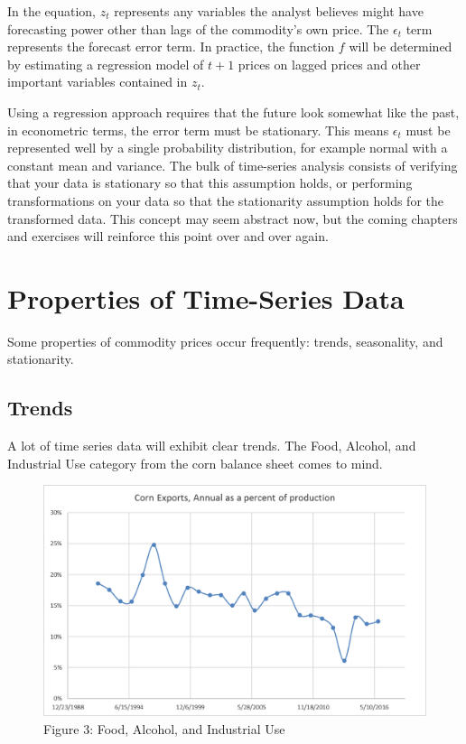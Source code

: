 \documentclass[]{book}
\theoremstyle{definition}
\theoremstyle{definition}
\theoremstyle{remark}
\begin{document}
In the equation, \(z_t\) represents any variables the analyst believes
might have forecasting power other than lags of the commodity's own
price. The \(\epsilon_t\) term represents the forecast error term. In
practice, the function \(f\) will be determined by estimating a
regression model of \(t+1\) prices on lagged prices and other important
variables contained in \(z_t\).

Using a regression approach requires that the future look somewhat like
the past, in econometric terms, the error term must be stationary. This
means \(\epsilon_t\) must be represented well by a single probability
distribution, for example normal with a constant mean and variance. The
bulk of time-series analysis consists of verifying that your data is
stationary so that this assumption holds, or performing transformations
on your data so that the stationarity assumption holds for the
transformed data. This concept may seem abstract now, but the coming
chapters and exercises will reinforce this point over and over again.

\section{Properties of Time-Series
Data}\label{properties-of-time-series-data}

Some properties of commodity prices occur frequently: trends,
seasonality, and stationarity.

\subsection{Trends}\label{trends}

A lot of time series data will exhibit clear trends. The Food, Alcohol,
and Industrial Use category from the corn balance sheet comes to mind.

\begin{figure}[htbp]
\centering
\includegraphics{Excel-files/IntroductiontoCommodityTS-FeedGrains_Corn_files/image010.png}
\caption{Figure 3: Food, Alcohol, and Industrial Use}
\end{figure}
\end{document}
